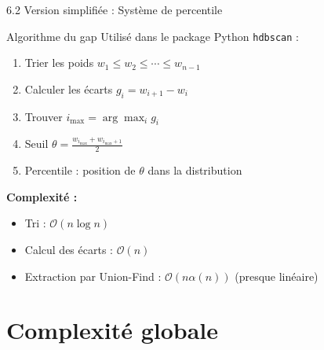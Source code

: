 \documentclass[aspectratio=139,8pt]{beamer}
\begin{document}
\begin{frame}{6.2 Version simplifiée : Système de percentile}
\begin{block}{Algorithme du gap}
Utilisé dans le package Python \texttt{hdbscan} :

\begin{enumerate}
\item Trier les poids $w_1 \leq w_2 \leq \cdots \leq w_{n-1}$
\item Calculer les écarts $g_i = w_{i+1} - w_i$
\item Trouver $i_{\max} = \arg\max_i g_i$
\item Seuil $\theta = \frac{w_{i_{\max}} + w_{i_{\max}+1}}{2}$
\item Percentile : position de $\theta$ dans la distribution
\end{enumerate}
\end{block}

\begin{figure}
\centering
{}
\end{figure}

\textbf{Complexité :}
\begin{itemize}
\item Tri : $\mathcal{O}(n \log n)$
\item Calcul des écarts : $\mathcal{O}(n)$
\item Extraction par Union-Find : $\mathcal{O}(n \alpha(n))$ (presque linéaire)
\end{itemize}
\end{frame}

\section{Complexité globale}
\end{document}
